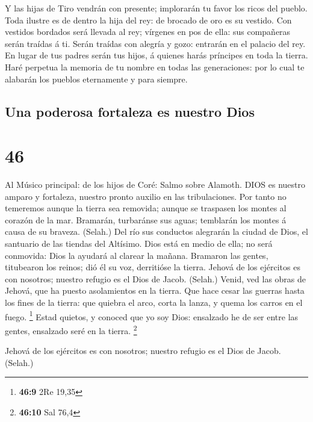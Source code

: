  Y las hijas de Tiro vendrán con presente; implorarán tu
favor los ricos del pueblo.  Toda ilustre es de dentro la
hija del rey: de brocado de oro es su vestido.  Con
vestidos bordados será llevada al rey; vírgenes en pos de ella: sus
compañeras serán traídas á ti.  Serán traídas con alegría y
gozo: entrarán en el palacio del rey.  En lugar de tus
padres serán tus hijos, á quienes harás príncipes en toda la tierra.
 Haré perpetua la memoria de tu nombre en todas las
generaciones: por lo cual te alabarán los pueblos eternamente y para
siempre.

\hypertarget{una-poderosa-fortaleza-es-nuestro-dios}{%
\subsection{Una poderosa fortaleza es nuestro
Dios}\label{una-poderosa-fortaleza-es-nuestro-dios}}

\hypertarget{section-45}{%
\section{46}\label{section-45}}

 Al Músico principal: de los hijos de Coré: Salmo sobre
Alamoth. DIOS es nuestro amparo y fortaleza, nuestro pronto auxilio en
las tribulaciones.  Por tanto no temeremos aunque la tierra
sea removida; aunque se traspasen los montes al corazón de la mar.
 Bramarán, turbaránse sus aguas; temblarán los montes á
causa de su braveza. (Selah.)  Del río sus conductos
alegrarán la ciudad de Dios, el santuario de las tiendas del Altísimo.
 Dios está en medio de ella; no será conmovida: Dios la
ayudará al clarear la mañana.  Bramaron las gentes,
titubearon los reinos; dió él su voz, derritióse la tierra. 
Jehová de los ejércitos es con nosotros; nuestro refugio es el Dios de
Jacob. (Selah.)  Venid, ved las obras de Jehová, que ha
puesto asolamientos en la tierra.  Que hace cesar las
guerras hasta los fines de la tierra: que quiebra el arco, corta la
lanza, y quema los carros en el fuego. \footnote{\textbf{46:9} 2Re 19,35}
 Estad quietos, y conoced que yo soy Dios: ensalzado he de
ser entre las gentes, ensalzado seré en la tierra. \footnote{\textbf{46:10}
  Sal 76,4}

 Jehová de los ejércitos es con nosotros; nuestro refugio
es el Dios de Jacob. (Selah.)

